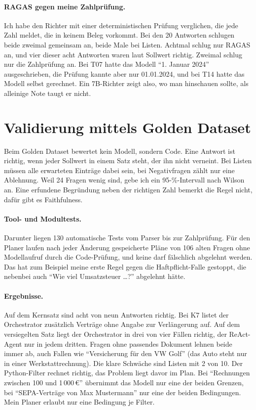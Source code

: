 \paragraph{RAGAS gegen meine Zahlprüfung.} Ich habe den Richter mit einer deterministischen Prüfung verglichen, die jede Zahl meldet, die in keinem Beleg vorkommt. Bei den 20 Antworten schlugen beide zweimal gemeinsam an, beide Male bei Listen. Achtmal schlug nur RAGAS an, und vier dieser acht Antworten waren laut Sollwert richtig. Zweimal schlug nur die Zahlprüfung an. Bei T07 hatte das Modell \enquote{1. Januar 2024} ausgeschrieben, die Prüfung kannte aber nur 01.01.2024, und bei T14 hatte das Modell selbst gerechnet. Ein 7B-Richter zeigt also, wo man hinschauen sollte, als alleinige Note taugt er nicht.

\section{Validierung mittels Golden Dataset}
\label{sec:golden}

Beim Golden Dataset bewertet kein Modell, sondern Code. Eine Antwort ist richtig, wenn jeder Sollwert in einem Satz steht, der ihn nicht verneint. Bei Listen müssen alle erwarteten Einträge dabei sein, bei Negativfragen zählt nur eine Ablehnung. Weil 24 Fragen wenig sind, gebe ich ein 95-\%-Intervall nach Wilson an. Eine erfundene Begründung neben der richtigen Zahl bemerkt die Regel nicht, dafür gibt es Faithfulness.

\paragraph{Tool- und Modultests.} Darunter liegen 130 automatische Tests vom Parser bis zur Zahlprüfung. Für den Planer laufen nach jeder Änderung gespeicherte Pläne von 106 alten Fragen ohne Modellaufruf durch die Code-Prüfung, und keine darf fälschlich abgelehnt werden. Das hat zum Beispiel meine erste Regel gegen die Haftpflicht-Falle gestoppt, die nebenbei auch \enquote{Wie viel Umsatzsteuer \dots?} abgelehnt hätte.

\paragraph{Ergebnisse.} Auf dem Kernsatz sind acht von neun Antworten richtig. Bei K7 listet der Orchestrator zusätzlich Verträge ohne Angabe zur Verlängerung auf. Auf dem versiegelten Satz liegt der Orchestrator in drei von vier Fällen richtig, der ReAct-Agent nur in jedem dritten. Fragen ohne passendes Dokument lehnen beide immer ab, auch Fallen wie \enquote{Versicherung für den VW Golf} (das Auto steht nur in einer Werkstattrechnung). Die klare Schwäche sind Listen mit 2 von 10. Der Python-Filter rechnet richtig, das Problem liegt davor im Plan. Bei \enquote{Rechnungen zwischen 100 und 1\,000\,€} übernimmt das Modell nur eine der beiden Grenzen, bei \enquote{SEPA-Verträge von Max Mustermann} nur eine der beiden Bedingungen. Mein Planer erlaubt nur eine Bedingung je Filter.

